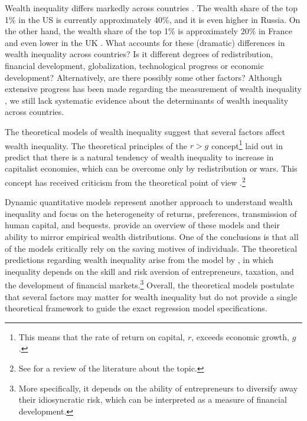 \begin{refsection}
Wealth inequality differs markedly across countries \parencite{daviesetal2011,daviesetal2017,milanovic2016global}. The wealth share of the top 1\% in the US is currently approximately 40\%, and it is even higher in Russia. On the other hand, the wealth share of the top 1\% is approximately 20\% in France and even lower in the UK \parencite{zucman2018}. What accounts for these (dramatic) differences in wealth inequality across countries? Is it different degrees of redistribution, financial development, globalization, technological progress or economic development? Alternatively, are there possibly some other factors? Although extensive progress has been made regarding the measurement of wealth inequality  \parencite{alvaredoetal2013,daviesetal2011,daviesetal2017,pikettyandzucman2014,SaezZucman2016}, we still lack systematic evidence about the determinants of wealth inequality across countries.

The theoretical models of wealth inequality suggest that several factors affect wealth inequality. The theoretical principles of the $r > g$ concept\footnote{This means that the rate of return on capital, $r$, exceeds economic growth, $g$.} laid out in \textcite{piketty2014} predict that there is a natural tendency of wealth inequality to increase in capitalist economies, which can be overcome only by redistribution or wars. This concept has received criticism from the theoretical point of view \parencite{blume2015capital,mankiw2015yes}.\footnote{See \textcite{king2017literature} for a review of the literature about the topic.} 

Dynamic quantitative models represent another approach to understand wealth inequality and focus on the heterogeneity of returns, preferences, transmission of human capital, and bequests. \textcite{DENARDI2017280} provide an overview of these models and their ability to mirror empirical wealth distributions. One of the conclusions is that all of the models critically rely on the saving motives of individuals. The theoretical predictions regarding wealth inequality arise from the model by \textcite{pastor2016income}, in which inequality depends on the skill and risk aversion of entrepreneurs, taxation, and the development of financial markets.\footnote{More specifically, it depends on the ability of entrepreneurs to diversify away their idiosyncratic risk, which can be interpreted as a measure of financial development.} Overall, the theoretical models postulate that several factors may matter for wealth inequality but do not provide a single theoretical framework to guide the exact regression model specifications. 


\end{refsection}
